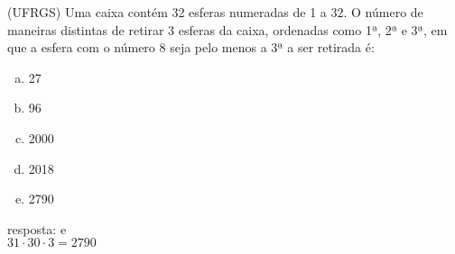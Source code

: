 \begin{ex}
(UFRGS)  Uma caixa contém 32 esferas numeradas de 1 a 32. O número de maneiras distintas de retirar 3 esferas da caixa, ordenadas como 1ª, 2ª e 3ª, em que a esfera com o número 8 seja pelo menos a 3ª a ser retirada é: 
  \begin{enumerate}  [(a)]
      \item 27
      \item 96
      \item 2000
      \item 2018
      \item 2790
  \end{enumerate}
    \begin{sol}
    resposta: e \\
    $31\cdot30\cdot3=2790$
    \end{sol}
\end{ex}